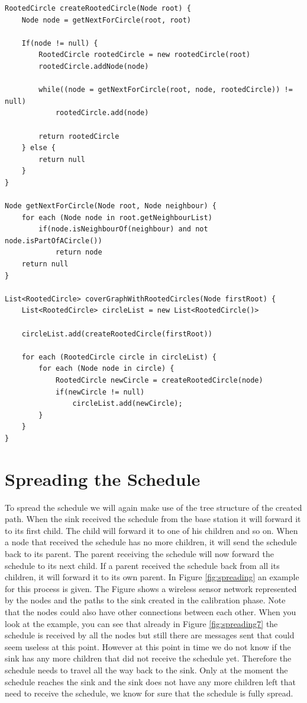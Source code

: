 \begin{lstlisting}
RootedCircle createRootedCircle(Node root) {
	Node node = getNextForCircle(root, root)	

	If(node != null) {
		RootedCircle rootedCircle = new rootedCircle(root)
		rootedCircle.addNode(node)

		while((node = getNextForCircle(root, node, rootedCircle)) != null)
			rootedCircle.add(node)

		return rootedCircle
	} else {
		return null
	}
}

Node getNextForCircle(Node root, Node neighbour) {
	for each (Node node in root.getNeighbourList)	
		if(node.isNeighbourOf(neighbour) and not node.isPartOfACircle())
			return node
	return null
}

List<RootedCircle> coverGraphWithRootedCircles(Node firstRoot) {
	List<RootedCircle> circleList = new List<RootedCircle()>
	
	circleList.add(createRootedCircle(firstRoot))

	for each (RootedCircle circle in circleList) {
		for each (Node node in circle) {
			RootedCircle newCircle = createRootedCircle(node)
			if(newCircle != null)
				circleList.add(newCircle);
		}
	}
}
\end{lstlisting}

\section{Spreading the Schedule}
To spread the schedule we will again make use of the tree structure of the created path. When the sink received the schedule from the base station it will forward it to its first child. The child will forward it to one of his children and so on. When a node that received the schedule has no more children, it will send the schedule back to its parent. The parent receiving the schedule will now forward the schedule to its next child. If a parent received the schedule back from all its children, it will forward it to its own parent. In Figure \ref{fig:spreading} an example for this process is given. The Figure shows a wireless sensor network represented by the nodes and the paths to the sink created in the calibration phase. Note that the nodes could also have other connections between each other. When you look at the example, you can see that already in Figure \ref{fig:spreading7} the schedule is received by all the nodes but still there are messages sent that could seem useless at this point. However at this point in time we do not know if the sink has any more children that did not receive the schedule yet. Therefore the schedule needs to travel all the way back to the sink. Only at the moment the schedule reaches the sink and the sink does not have any more children left that need to receive the schedule, we know for sure that the schedule is fully spread.


